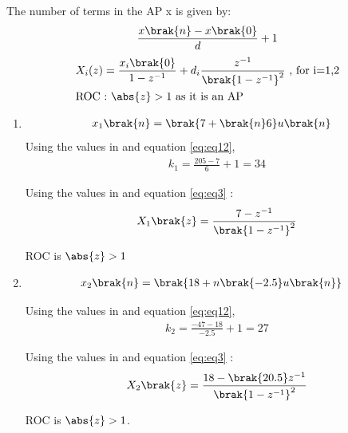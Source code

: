 \documentclass[journal,12pt,twocolumn]{IEEEtran}
\theoremstyle{remark}
\begin{document}
\solution
\fi

The number of terms in the AP x is given by: 
\begin{align}  \label{eq:eq12}
    \frac{x\brak{n} - x\brak{0}}{d} + 1
\end{align}
\begin{align}
    &X_i(z) = \frac{x_i\brak{0}}{1 - z^{-1}} + d_i\frac{z^{-1}}{\brak{1-z^{-1}}^2} \text{ , for i=1,2} \label{eq:eq3}\\
    &\text{ROC : $\abs{z} > 1$ as it is an AP}   
\end{align}
\begin{enumerate}
    \item 
\begin{align}
x_{1}\brak{n} &= \brak{7 + \brak{n}6}u\brak{n}
\end{align}
Using the values in  and equation \eqref{eq:eq12},
\begin{align}
    k_1 = \frac{205 - 7}{6} + 1 = 34
\end{align}

Using the values in  and equation \eqref{eq:eq3} :
\begin{align}
 X_1\brak{z} = \frac{7 - z^{-1}}{\brak{1-z^{-1}}^2}
\end{align}

ROC is $\abs{z} > 1$
 
   \item
   
\begin{align}
    x_{2}\brak{n} &= \brak{18 + n\brak{-2.5}u\brak{n}}
\end{align}

Using the values in  and equation \eqref{eq:eq12},
\begin{align}
    k_2 = \frac{-47 - 18}{-2.5} + 1 = 27
\end{align}

Using the values in  and equation \eqref{eq:eq3} :
\begin{align} 
 X_2\brak{z} = \frac{18 - \brak{20.5}z^{-1}}{\brak{1 - z^{-1}}^2}
\end{align}

ROC is $\abs{z} > 1$.


\end{enumerate}
\end{document}
